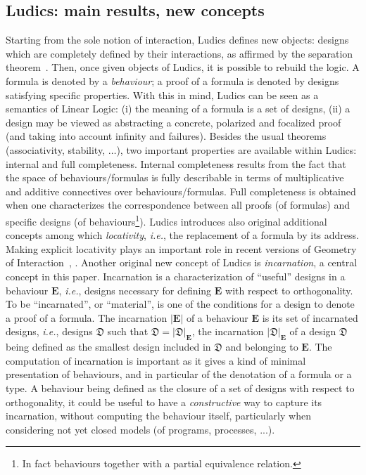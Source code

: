 \documentclass{LMCS}
\def\ie{{\em i.e.}}
\newcommand{\design}[1]{{\mathfrak{#1}}}
\newcommand{\designset}[1]{{\mathrm{#1}}}
\newcommand{\behaviour}[1]{{\mathbf{#1}}}
\newcommand{\Bincarnation}[1]{|{\designset{#1}}|}
\newcommand{\Dincarnation}[2]{|{\design{#1}}|_{\designset{#2}}}
\begin{document}
{\subsection{Ludics: main results, new concepts} 

Starting from the sole notion of interaction, Ludics  defines new objects: 
designs which are completely defined by their interactions, as affirmed by the separation theorem~\cite{DBLP:journals/mscs/Girard01}. 
Then, once given objects of Ludics, it is possible to rebuild the logic. A formula is denoted by a {\em behaviour}; a proof of a formula is denoted by designs satisfying specific properties.
With this in mind, Ludics can be seen as a semantics of Linear Logic: (i) the meaning of a formula is a set of designs, (ii) a design may be viewed as abstracting a concrete, polarized and focalized proof (and taking into account infinity and failures). 
Besides the usual theorems (associativity, stability, $\dots$), two important properties are available within Ludics: internal and full completeness. Internal completeness results from the fact that the space of behaviours/formulas is fully describable in terms of multiplicative and additive connectives over behaviours/formulas.
Full completeness is obtained when one characterizes the correspondence between all proofs (of formulas) and specific designs (of behaviours\footnote{In fact behaviours together with a partial equivalence relation.}).
Ludics introduces also original additional concepts among which {\em locativity}, \ie, the replacement of a formula by its address. Making explicit locativity  plays an important role in recent versions of Geometry of Interaction~\cite{DBLP:journals/tcs/Girard11}, \cite{DBLP:journals/apal/Seiller12}. Another original new concept of Ludics is {\em incarnation}, a central concept in this paper.
Incarnation is a characterization of ``useful'' designs in a behaviour $\behaviour{E}$, \ie, designs necessary for defining $\behaviour{E}$ with respect to orthogonality. To be ``incarnated'', or ``material'', is one of the conditions for a design to denote a proof of a formula. The incarnation $\Bincarnation{\behaviour{E}}$ of a behaviour $\behaviour{E}$ is its set of incarnated designs, \ie, designs $\design{D}$ such that $\design{D} = \Dincarnation{D}{\behaviour{E}}$, the incarnation $\Dincarnation{D}{\behaviour{E}}$ of a design $\design{D}$ being defined as the smallest design included in $\design{D}$ and belonging to $\behaviour{E}$.
The computation of incarnation is important as it gives a kind of minimal presentation of behaviours, and in particular of the denotation of a formula or a type. 
A behaviour being defined as the closure of a set of designs with respect to orthogonality, it could be useful to have a {\em constructive} way to capture its incarnation, without computing the behaviour itself, particularly when considering not yet closed models (of programs, processes, ...). 


}
\end{document}

